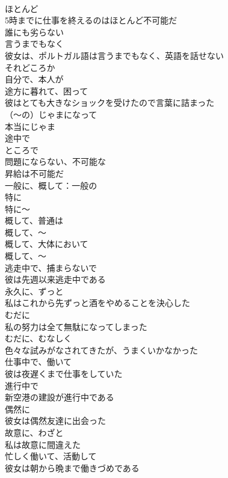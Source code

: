 \documentclass[8pt]{extreport}
\begin{document}
\begin{CJK}{UTF8}{min}
\\	ほとんど	
\\	5時までに仕事を終えるのはほとんど不可能だ
\\	誰にも劣らない	
\\	言うまでもなく	
\\	彼女は、ポルトガル語は言うまでもなく、英語を話せない
\\	それどころか	
\\	自分で、本人が	
\\	途方に暮れて、困って	
\\	彼はとても大きなショックを受けたので言葉に詰まった
\\	（～の）じゃまになって	
\\	本当にじゃま
\\	途中で	
\\	ところで	
\\	問題にならない、不可能な	
\\	昇給は不可能だ
\\	一般に、概して：一般の	
\\	特に	
\\	特に～
\\	概して、普通は	
\\	概して、～
\\	概して、大体において	
\\	概して、～
\\	逃走中で、捕まらないで	
\\	彼は先週以来逃走中である
\\	永久に、ずっと	
\\	私はこれから先ずっと酒をやめることを決心した
\\	むだに	
\\	私の努力は全て無駄になってしまった
\\	むだに、むなしく	
\\	色々な試みがなされてきたが、うまくいかなかった
\\	仕事中で、働いて	
\\	彼は夜遅くまで仕事をしていた
\\	進行中で	
\\	新空港の建設が進行中である
\\	偶然に	
\\	彼女は偶然友達に出会った
\\	故意に、わざと	
\\	私は故意に間違えた
\\	忙しく働いて、活動して	
\\	彼女は朝から晩まで働きづめである

\end{CJK}
\end{document}
